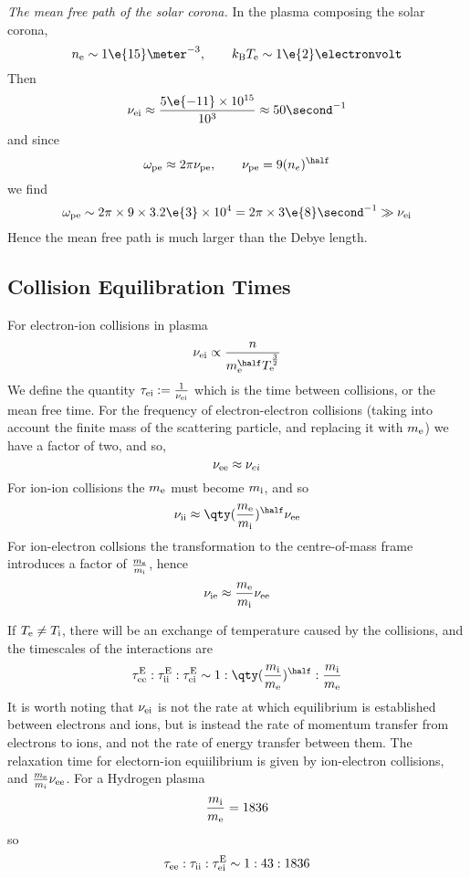 \documentclass{book}         		                %
\begin{document}
\begin{example}{\em The mean free path of the solar corona.}
  In the plasma composing the solar corona,
\[ n_{\rm e} \sim 1 \e{15} \meter^{-3} , \qquad k_{\rm B} T_{\rm e} \sim 1\e{2} \electronvolt \]
Then
\[ \nu_{\rm ei} \approx \frac{5\e{-11} \times 10^{15}}{10^3} \approx 50 \second^{-1} \]
and since
\[ \omega_{\rm pe} \approx 2 \pi \nu_{\rm pe}, \qquad \nu_{\rm pe} = 9(n_e)^{\half} \]
we find
\[ \omega_{\rm pe} \sim 2 \pi \times 9 \times 3.2\e{3} \times 10^4 = 2
\pi \times 3\e{8} \second^{-1} \gg \nu_{\rm ei} \] Hence the mean free
path is much larger than the Debye length.
\end{example}

\subsection{Collision Equilibration Times}
\label{sec:coll-equil-times}

For electron-ion collisions in plasma 
\[ \nu_{\rm ei} \propto \frac{n}{m_{\rm e}^{\half} T_{\rm
    e}^{\frac{3}{2}}} \] We define the quantity $\tau_{\rm ei} :=
\frac{1}{\nu_{\rm ei}}$ which is the time between collisions, or the
mean free time.
For the frequency of electron-electron collisions (taking into account the finite mass of the scattering particle, and replacing it with $m_{\rm e}$) we have a factor of two, and so,
\[ \nu_{\rm ee} \approx \nu_{ei} \]
For ion-ion collisions the $m_{\rm e}$ must become $m_{\rm i}$, and so
\[ \nu_{\rm ii} \approx \qty( \frac{m_{\rm e}}{m_{\rm i}} )^{\half}
\nu_{\rm ee} \] For ion-electron collsions the transformation to the
centre-of-mass frame introduces a factor of $\frac{m_{\rm e}}{m_{\rm
    i}}$, hence 
\[ \nu_{\rm ie} \approx \frac{m_{\rm e}}{m_{\rm i}} \nu_{\rm ee} \]

If $T_{\rm e} \neq T_{\rm i}$, there will be an exchange of
temperature caused by the collisions, and the timescales of the interactions are
\[ \tau_{\rm ee}^{\rm E} : \tau_{\rm ii}^{\rm E} : \tau_{\rm ei}^{\rm
  E} \sim 1 : \qty( \frac{m_{\rm i}}{m_{\rm e}} )^{\half} :
\frac{m_{\rm i}}{m_{\rm e}} \] It is worth noting that $\nu_{\rm ei}$
is not the rate at which equilibrium is established between electrons
and ions, but is instead the rate of momentum transfer from electrons
to ions, and not the rate of energy transfer between them. The
relaxation time for electorn-ion equiilibrium is given by ion-electron
collisions, and $\frac{m_{\rm e}}{m_{\rm i}} \nu_{\rm ee}$. For a Hydrogen plasma
\[ \frac{m_{\rm i}}{m_{\rm e}} = 1836 \]
so
\begin{equation}
  \label{eq:21}
  \tau_{\rm ee} : \tau_{\rm ii} : \tau_{\rm ei}^{\rm E} \sim 1 : 43 : 1836
\end{equation}
\end{document}
